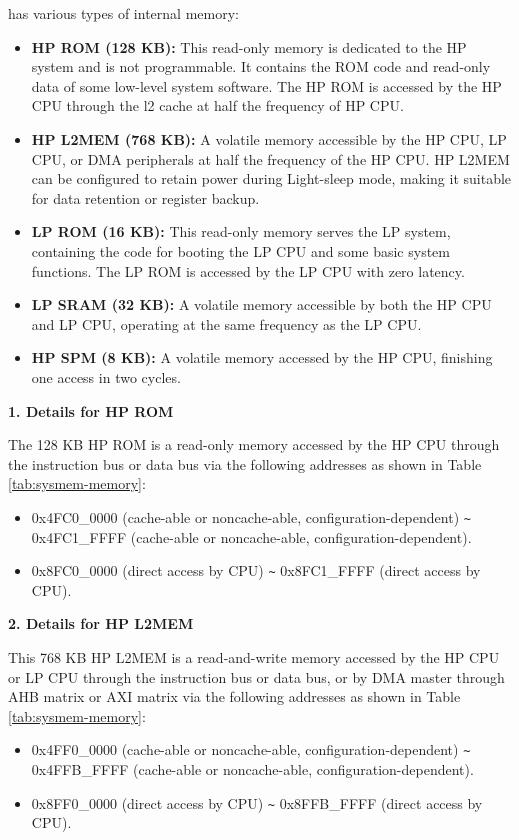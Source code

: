 \documentclass[main\_\_EN.tex]{subfiles}
\begin{document}
\chipname{} has various types of internal memory:

\begin{itemize}
    \item \textbf{HP ROM (128 KB):} This read-only memory is dedicated to the HP system and is not programmable. It contains the ROM code and read-only data of some low-level system software. The HP ROM is accessed by the HP CPU through the l2 cache at half the frequency of HP CPU.
    \item \textbf{HP L2MEM (768 KB):} A volatile memory accessible by the HP CPU, LP CPU, or DMA peripherals at half the frequency of the HP CPU. HP L2MEM can be configured to retain power during Light-sleep mode, making it suitable for data retention or register backup.
    \item \textbf{LP ROM (16 KB):} This read-only memory serves the LP system, containing the code for booting the LP CPU and some basic system functions. The LP ROM is accessed by the LP CPU with zero latency.
    \item \textbf{LP SRAM (32 KB):} A volatile memory accessible by both the HP CPU and LP CPU, operating at the same frequency as the LP CPU.
    \item \textbf{HP SPM (8 KB):} A volatile memory accessed by the HP CPU, finishing one access in two cycles.
\end{itemize}

{\bfseries 1. Details for HP ROM}

The 128 KB HP ROM is a read-only memory accessed by the HP CPU through the instruction bus or data bus via the following addresses as shown in Table \ref{tab:sysmem-memory}:
\begin{itemize}
    \item 0x4FC0\_0000 (cache-able or noncache-able, configuration-dependent) \verb+~+ 0x4FC1\_FFFF (cache-able or noncache-able, configuration-dependent).
    \item 0x8FC0\_0000 (direct access by CPU) \verb+~+ 0x8FC1\_FFFF (direct access by CPU).
\end{itemize}

{\bfseries  2. Details for HP L2MEM}
\label{other:sysmem-internal-sram-0}

This 768 KB HP L2MEM is a read-and-write memory accessed by the HP CPU or LP CPU through the instruction bus or data bus, or by DMA master through AHB matrix or AXI matrix via the following addresses as shown in Table \ref{tab:sysmem-memory}:
\begin{itemize}
    \item 0x4FF0\_0000 (cache-able or noncache-able, configuration-dependent) \verb+~+ 0x4FFB\_FFFF (cache-able or noncache-able, configuration-dependent).
    \item 0x8FF0\_0000 (direct access by CPU) \verb+~+ 0x8FFB\_FFFF (direct access by CPU).
\end{itemize}
\end{document}
